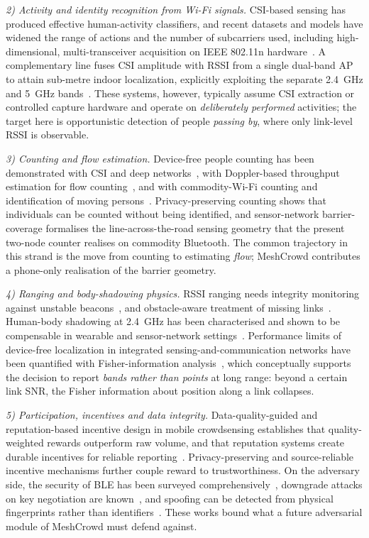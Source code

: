 \documentclass[journal,10pt]{IEEEtran}
\begin{document}
\textit{2) Activity and identity recognition from Wi-Fi signals.} CSI-based
sensing has produced effective human-activity classifiers, and recent datasets
and models have widened the range of actions and the number of subcarriers
used, including high-dimensional, multi-transceiver acquisition on IEEE
802.11n hardware~\cite{wong2024}. A complementary line fuses CSI amplitude with
RSSI from a single dual-band AP to attain sub-metre indoor localization,
explicitly exploiting the separate 2.4~GHz and 5~GHz bands~\cite{sanchez2020}.
These systems, however, typically assume CSI extraction or controlled capture
hardware and operate on \emph{deliberately performed} activities; the target
here is opportunistic detection of people \emph{passing by}, where only
link-level RSSI is observable.

\textit{3) Counting and flow estimation.} Device-free people counting has been
demonstrated with CSI and deep networks~\cite{khan2023}, with Doppler-based
throughput estimation for flow counting~\cite{zhou2020}, and with commodity-Wi-Fi
counting and identification of moving persons~\cite{dmip2023}. Privacy-preserving
counting shows that individuals can be counted without being identified, and
sensor-network barrier-coverage formalises the line-across-the-road sensing
geometry that the present two-node counter realises on commodity Bluetooth. The
common trajectory in this strand is the move from counting to estimating
\emph{flow}; MeshCrowd contributes a phone-only realisation of the barrier
geometry.

\textit{4) Ranging and body-shadowing physics.} RSSI ranging needs integrity
monitoring against unstable beacons~\cite{ramirez2021,bai2020}, and
obstacle-aware treatment of missing links~\cite{bai2020}. Human-body shadowing
at 2.4~GHz has been characterised and shown to be compensable in wearable and
sensor-network settings~\cite{januszkiewicz2018}. Performance limits of
device-free localization in integrated sensing-and-communication networks have
been quantified with Fisher-information analysis~\cite{li2024}, which
conceptually supports the decision to report \emph{bands rather than points} at
long range: beyond a certain link SNR, the Fisher information about position
along a link collapses.

\textit{5) Participation, incentives and data integrity.} Data-quality-guided
and reputation-based incentive design in mobile crowdsensing establishes that
quality-weighted rewards outperform raw volume, and that reputation systems
create durable incentives for reliable
reporting~\cite{zhang2022,wang2018}. Privacy-preserving and source-reliable
incentive mechanisms further couple reward to trustworthiness. On the adversary
side, the security of BLE has been surveyed comprehensively~\cite{casar2022},
downgrade attacks on key negotiation are known~\cite{antonioli2020}, and
spoofing can be detected from physical fingerprints rather than
identifiers~\cite{cai2024}. These works bound what a future adversarial module
of MeshCrowd must defend against.
\end{document}
